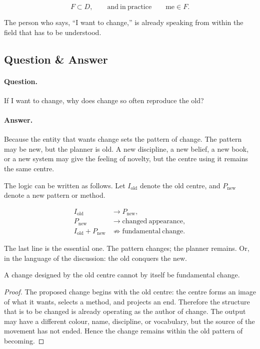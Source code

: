 \begin{equation}
F \subset D,
\qquad
\mathrm{and\ in\ practice}\qquad
\mathrm{me}\in F.
\end{equation}

The person who says, ``I want to change,'' is already speaking from within the field that has to be understood.

\subsection{Question \& Answer}

\paragraph{Question.}
If I want to change, why does change so often reproduce the old?

\paragraph{Answer.}
Because the entity that wants change sets the pattern of change. The pattern may be new, but the planner is old. A new discipline, a new belief, a new book, or a new system may give the feeling of novelty, but the centre using it remains the same centre.

The logic can be written as follows. Let \(I_{\mathrm{old}}\) denote the old centre, and \(P_{\mathrm{new}}\) denote a new pattern or method.

\begin{align}
I_{\mathrm{old}} &\longrightarrow P_{\mathrm{new}},\\
P_{\mathrm{new}} &\longrightarrow \mathrm{changed\ appearance},\\
I_{\mathrm{old}}+P_{\mathrm{new}} &\not\Rightarrow \mathrm{fundamental\ change}.
\end{align}

The last line is the essential one. The pattern changes; the planner remains. Or, in the language of the discussion: the old conquers the new.

\begin{proposition}
A change designed by the old centre cannot by itself be fundamental change.
\end{proposition}

\begin{proof}
The proposed change begins with the old centre: the centre forms an image of what it wants, selects a method, and projects an end. Therefore the structure that is to be changed is already operating as the author of change. The output may have a different colour, name, discipline, or vocabulary, but the source of the movement has not ended. Hence the change remains within the old pattern of becoming.
\end{proof}

